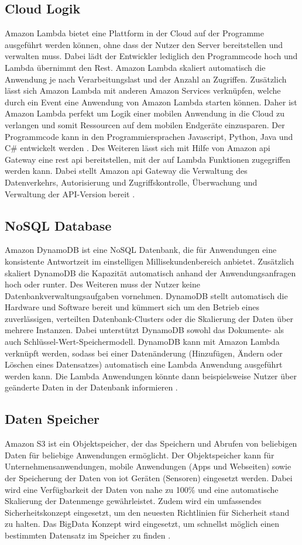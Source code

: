\subsection{Cloud Logik}
Amazon Lambda bietet eine Plattform in der Cloud auf der Programme ausgeführt werden können, ohne dass der Nutzer den Server bereitstellen und verwalten muss. Dabei lädt der Entwickler lediglich den Programmcode hoch und Lambda übernimmt den Rest. Amazon Lambda skaliert automatisch die Anwendung je nach Verarbeitungslast und der Anzahl an Zugriffen. Zusätzlich lässt sich Amazon Lambda mit anderen Amazon Services verknüpfen, welche durch ein Event eine Anwendung von Amazon Lambda starten können. Daher ist Amazon Lambda perfekt um Logik einer mobilen Anwendung in die Cloud zu verlangen und somit Ressourcen auf dem mobilen Endgeräte einzusparen. Der Programmcode kann in den Programmiersprachen Javascript, Python, Java und C\# entwickelt werden \cite{AmazonLambda}. Des Weiteren lässt sich mit Hilfe von Amazon \gls{api} Gateway eine \gls{rest} \gls{api} bereitstellen, mit der auf Lambda Funktionen zugegriffen werden kann. Dabei stellt Amazon \gls{api} Gateway die Verwaltung des Datenverkehrs, Autorisierung und Zugriffskontrolle, Überwachung und Verwaltung der API-Version bereit \cite{AmazonAPIGateway}.

\subsection{NoSQL Database}
Amazon DynamoDB ist eine NoSQL Datenbank, die für Anwendungen eine konsistente Antwortzeit im einstelligen Millisekundenbereich anbietet. Zusätzlich skaliert DynamoDB die Kapazität automatisch anhand der Anwendungsanfragen hoch oder runter. Des Weiteren muss der Nutzer keine Datenbankverwaltungsaufgaben vornehmen. DynamoDB stellt automatisch die Hardware und Software bereit und kümmert sich um den Betrieb eines zuverlässigen, verteilten Datenbank-Clusters oder die Skalierung der Daten über mehrere Instanzen. Dabei unterstützt DynamoDB sowohl das Dokumente- als auch Schlüssel-Wert-Speichermodell. DynamoDB kann mit Amazon Lambda verknüpft werden, sodass bei einer Datenänderung (Hinzufügen, Ändern oder Löschen eines Datensatzes) automatisch eine Lambda Anwendung ausgeführt werden kann. Die Lambda Anwendungen könnte dann beispielsweise Nutzer über geänderte Daten in der Datenbank informieren \cite{AmazonDynamoDB}. 

\subsection{Daten Speicher}
Amazon S3 ist ein Objektspeicher, der das Speichern und Abrufen von beliebigen Daten für beliebige Anwendungen ermöglicht. Der Objektspeicher kann für Unternehmensanwendungen, mobile Anwendungen (Apps und Webseiten) sowie der Speicherung der Daten von \acs{iot} Geräten (Sensoren) eingesetzt werden. Dabei wird eine Verfügbarkeit der Daten von nahe zu 100\% und eine automatische Skalierung der Datenmenge gewährleistet. Zudem wird ein umfassendes Sicherheitskonzept eingesetzt, um den neuesten Richtlinien für Sicherheit stand zu halten. Das BigData Konzept wird eingesetzt, um schnellst möglich einen bestimmten Datensatz im Speicher zu finden \cite{AmazonE3}.

